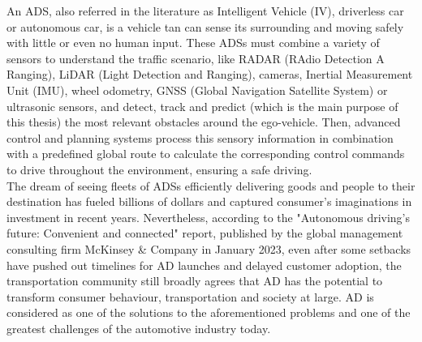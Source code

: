 An \ac{ADS}, also referred in the literature as Intelligent Vehicle (IV), driverless car or autonomous car, is a vehicle tan can sense its surrounding and moving safely with little or even no human input. These \acp{ADS} must combine a variety of sensors to understand the traffic scenario, like RADAR (RAdio Detection A Ranging), LiDAR (Light Detection and Ranging), cameras, Inertial Measurement Unit (IMU), wheel odometry, GNSS (Global Navigation Satellite System) or ultrasonic sensors, and detect, track and predict (which is the main purpose of this thesis) the most relevant obstacles around the ego-vehicle. Then, advanced control and planning systems process this sensory information in combination with a predefined global route to calculate the corresponding control commands to drive throughout the environment, ensuring a safe driving. \\

The dream of seeing fleets of \acp{ADS} efficiently delivering goods and people to their destination has fueled billions of dollars and captured consumer's imaginations in investment in recent years. Nevertheless, according to the "Autonomous driving's future: Convenient and connected" report, published by the global management consulting firm McKinsey \& Company in January 2023, even after some setbacks have pushed out timelines for \ac{AD} launches and delayed customer adoption, the transportation community still broadly agrees that \ac{AD} has the potential to transform consumer behaviour, transportation and society at large. \ac{AD} is considered as one of the solutions to the aforementioned problems and one of the greatest challenges of the automotive industry today. \\

